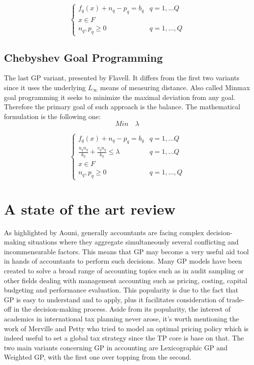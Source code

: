 \documentclass{article}
\begin{document}
\[
\begin{cases}
f_q(x)+n_q-p_q=b_q & q=1,...Q
\\
x\in F
\\
n_q,p_q\geq0 & q=1,...,Q
\end{cases}
\]

\subsection{Chebyshev Goal Programming}
The last GP variant, presented by Flavell. It differs from the first two variants since it uses the underlying $ L_\infty $ means of measuring distance. Also called Minmax goal programming it seeks to minimize the maximal deviation from any goal. Therefore the primary goal of such approach is the balance. The mathematical formulation is the following one:
\[
Min \quad \lambda
\]

\[
\begin{cases}
f_q(x)+n_q-p_q=b_q & q=1,...Q
\\
\frac{u_q n_q}{k_q}+\frac{v_q n_q}{k_q}\leq\lambda & q=1,...Q
\\
x\in F
\\
n_q,p_q\geq0 & q=1,...,Q
\end{cases}
\]

\section{A state of the art review}
As highlighted by Aouni\cite{aouni_goal_2017}, generally accountants are facing complex decision-making situations where they aggregate simultaneously several conflicting and incommensurable factors. This means that GP may become a very useful aid tool in hands of accountants to perform such decisions. Many GP models have been created to solve a broad range of accounting topics such as in audit sampling\cite{tayi_integration_1985} or other fields dealing with management accounting such as pricing\cite{tan_multipleobjective_2008}, costing\cite{dowlatshahi_product_2001}, capital budgeting and performance evaluation\cite{hung_integrated_2011}.
This popularity is due to the fact that GP is easy to understand and to apply, plus it facilitates consideration of trade-off in the decision-making process.
Aside from its popularity, the interest of academics in international tax planning never arose,
it’s worth mentioning the work of Merville and Petty\cite{merville_transfer_1978} who tried to model an optimal pricing policy which is indeed useful to set a global tax
strategy since the TP core is base on that.
The two main variants concerning GP in accounting are Lexicographic GP and Weighted GP, with the first one over topping from the second.
\end{document}
